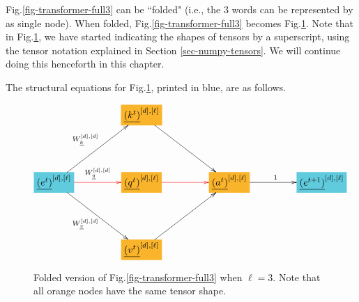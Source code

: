 Fig.\ref{fig-transformer-full3} can
be ``folded" (i.e., the 3 words can be
represented by as single node).
When folded, Fig.\ref{fig-transformer-full3}
becomes Fig.\ref{fig-transformer-recurrent-folded-1head}. Note that in Fig.\ref{fig-transformer-recurrent-folded-1head}, we have started indicating the
shapes of tensors by a superscript,
using the tensor notation
explained in Section \ref{sec-numpy-tensors}. We will continue doing this henceforth in this chapter.

The structural equations for
Fig.\ref{fig-transformer-recurrent-folded-1head}, printed in blue,
are as follows.




\begin{figure}[!h]\centering
$$\xymatrix@R=4pc@C=4pc{
&*+[F*:Dandelion]{\underline{(k^t)}^{[d],[\ell]}}\ar[dr]&&
\\
*+[F*:SkyBlue]{\underline{(e^t)}^{[d],[\ell]}}\ar[ur]^{W_\rvk^{[d], [d]}}\ar@[red][r]^{W_\rvq^{[d], [d]}}\ar[dr]_{W_\rvv^{[d], [d]}}&*+[F*:Dandelion]{\underline{(q^t)}^{[d],[\ell]}}\ar@[red][r]&*+[F*:Dandelion]{\underline{(a^t)}^{[d],[\ell]}}\ar[r]^{1}&*+[F*:SkyBlue]{\underline{(e^{t+1})}^{[d],[\ell]}}
\\
&*+[F*:Dandelion]{\underline{(v^t)}^{[d],[\ell]}}\ar[ur]&&
}$$
\caption{Folded version of
Fig.\ref{fig-transformer-full3} when $\ell=3$. Note that all orange nodes
have the same tensor shape.}
\label{fig-transformer-recurrent-folded-1head}
\end{figure}

